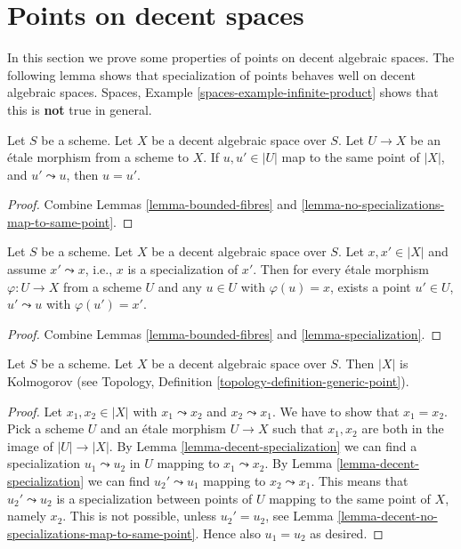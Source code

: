 \section{Points on decent spaces}
\label{section-points}

\noindent
In this section we prove some properties of points on decent algebraic spaces.
The following lemma shows that specialization of points behaves well
on decent algebraic spaces.
Spaces, Example \ref{spaces-example-infinite-product}
shows that this is {\bf not} true in general.

\begin{lemma}
\label{lemma-decent-no-specializations-map-to-same-point}
Let $S$ be a scheme. Let $X$ be a decent algebraic space over $S$.
Let $U \to X$ be an \'etale morphism from a scheme to $X$.
If $u, u' \in |U|$ map to the same point of $|X|$, and
$u' \leadsto u$, then $u = u'$.
\end{lemma}

\begin{proof}
Combine Lemmas \ref{lemma-bounded-fibres} and
\ref{lemma-no-specializations-map-to-same-point}.
\end{proof}

\begin{lemma}
\label{lemma-decent-specialization}
Let $S$ be a scheme. Let $X$ be a decent algebraic space over $S$.
Let $x, x' \in |X|$ and assume $x' \leadsto x$, i.e., $x$ is a
specialization of $x'$. Then for every \'etale morphism
$\varphi : U \to X$ from a scheme $U$ and any $u \in U$ with
$\varphi(u) = x$, exists a point $u'\in U$, $u' \leadsto u$ with
$\varphi(u') = x'$.
\end{lemma}

\begin{proof}
Combine Lemmas \ref{lemma-bounded-fibres} and
\ref{lemma-specialization}.
\end{proof}

\begin{lemma}
\label{lemma-kolmogorov}
Let $S$ be a scheme. Let $X$ be a decent algebraic space over $S$.
Then $|X|$ is Kolmogorov (see
Topology, Definition \ref{topology-definition-generic-point}).
\end{lemma}

\begin{proof}
Let $x_1, x_2 \in |X|$ with $x_1 \leadsto x_2$ and $x_2 \leadsto x_1$.
We have to show that $x_1 = x_2$. Pick a scheme $U$ and an \'etale morphism
$U \to X$ such that $x_1, x_2$ are both in the image of $|U| \to |X|$.
By Lemma \ref{lemma-decent-specialization} we can find a specialization
$u_1 \leadsto u_2$ in $U$ mapping to $x_1 \leadsto x_2$.
By Lemma \ref{lemma-decent-specialization} we can find
$u_2' \leadsto u_1$ mapping to $x_2 \leadsto x_1$. This means that
$u_2' \leadsto u_2$ is a specialization between points of $U$ mapping to
the same point of $X$, namely $x_2$. This is not possible, unless
$u_2' = u_2$, see
Lemma \ref{lemma-decent-no-specializations-map-to-same-point}. Hence
also $u_1 = u_2$ as desired.
\end{proof}

